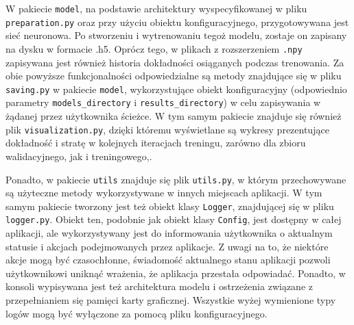 W pakiecie \verb|model|, na podstawie architektury wyspecyfikowanej w pliku \verb|preparation.py| oraz przy użyciu obiektu konfiguracyjnego, przygotowywana jest sieć neuronowa. Po stworzeniu i wytrenowaniu tegoż modelu, zostaje on zapisany na dysku w formacie .h5. Oprócz tego, w plikach z rozszerzeniem \verb|.npy| zapisywana jest również historia dokładności osiąganych podczas trenowania. Za obie powyższe funkcjonalności odpowiedzialne są metody znajdujące się w pliku \verb|saving.py| w pakiecie \verb|model|, wykorzystujące obiekt konfiguracyjny (odpowiednio parametry \verb|models_directory| i \verb|results_directory|) w celu zapisywania w żądanej przez użytkownika ścieżce. W tym samym pakiecie znajduje się również plik \verb|visualization.py|, dzięki któremu wyświetlane są wykresy prezentujące dokładność i stratę w kolejnych iteracjach treningu, zarówno dla zbioru walidacyjnego, jak i treningowego,.

Ponadto, w pakiecie \verb|utils| znajduje się plik \verb|utils.py|, w którym przechowywane są użyteczne metody wykorzystywane w innych miejscach aplikacji. W tym samym pakiecie tworzony jest też obiekt klasy \verb|Logger|, znajdującej się w pliku \verb|logger.py|. Obiekt ten, podobnie jak obiekt klasy \verb|Config|, jest dostępny w całej aplikacji, ale wykorzystywany jest do informowania użytkownika o aktualnym statusie i akcjach podejmowanych przez aplikacje. Z uwagi na to, że niektóre akcje mogą być czasochłonne, świadomość aktualnego stanu aplikacji pozwoli użytkownikowi uniknąć wrażenia, że aplikacja przestała odpowiadać. Ponadto, w konsoli wypisywana jest też architektura modelu i ostrzeżenia związane z przepełnianiem się pamięci karty graficznej. Wszystkie wyżej wymienione typy logów mogą być wyłączone za pomocą pliku konfiguracyjnego.

